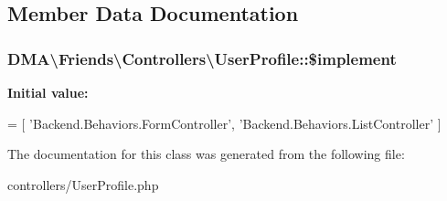 \subsection{Member Data Documentation}
\hypertarget{classDMA_1_1Friends_1_1Controllers_1_1UserProfile_aa1a2c22e3663622a57612b583505c97e}{
\subsubsection[{\$implement}]{\setlength{\rightskip}{0pt plus 5cm}D\+M\+A\textbackslash{}\+Friends\textbackslash{}\+Controllers\textbackslash{}\+User\+Profile\+::\$implement}}\label{classDMA_1_1Friends_1_1Controllers_1_1UserProfile_aa1a2c22e3663622a57612b583505c97e}
{\bfseries Initial value\+:}
\begin{DoxyCode}
= [
        \textcolor{stringliteral}{'Backend.Behaviors.FormController'},
        \textcolor{stringliteral}{'Backend.Behaviors.ListController'}
    ]
\end{DoxyCode}


The documentation for this class was generated from the following file\+:\begin{DoxyCompactItemize}
\item 
controllers/User\+Profile.\+php\end{DoxyCompactItemize}
